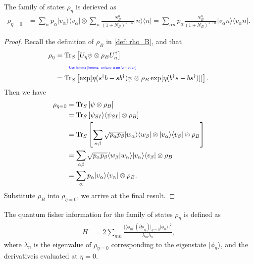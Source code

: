 \documentclass[../../note.tex]{subfiles}
\begin{document}
\begin{lemma}[$\rho_{\eta = 0}$]
    The family of states $\rho_{\eta}$ is derieved as
    \begin{align}
        \rho_{\eta = 0}
        &= \sum_{\alpha} p_{\alpha} \vert v_{\alpha} \rangle \langle v_{\alpha} \vert \otimes \sum_n \frac{N_B^n}{(1 + N_B)^{1 + n}} \vert n \rangle \langle n \vert = \sum_{\alpha n} p_{\alpha} \frac{N_B^n}{(1+N_B)^{1+n}} \vert v_{\alpha} n \rangle \langle v_{\alpha } n \vert.
    \end{align}
\end{lemma}
\begin{proof}
    Recall the definition of $\rho_B$ in \ref{def: rho_B}, and that 
    \begin{align}
        \rho_{\eta}
        &= \operatorname{Tr}_S\left[U_{\eta} \psi \otimes \rho_B U_{\eta}^\dagger \right] \\
        &\qquad\text{\color{blue}{\tiny\sffamily Use lemma \ref{lemma: unitary transformation}}} \nonumber \\
        &= \operatorname{Tr}_S\left[\exp[\eta (s^\dagger b -s b^{\dagger}) \psi \otimes \rho_B \exp[\eta(b^\dagger s - b s^\dagger)]] \right].
    \end{align}
    Then we have
    \begin{align}
        \rho_{\eta = 0}
        &= \operatorname{Tr}_S\left[\psi \otimes \rho_B \right]  \\
        &= \operatorname{Tr}_S\left[\psi_{SI} \rangle \langle \psi_{SI} \vert \otimes \rho_B \right] \\
        &= \operatorname{Tr}_S\left[\sum_{\alpha \beta} \sqrt{p_{\alpha} p_{\beta}} \vert w_{\alpha} \rangle \langle w_{\beta} \vert \otimes \vert v_{\alpha} \rangle \langle v_{\beta} \vert \otimes \rho_B \right] \\
        &= \sum_{\alpha \beta} \sqrt{p_{\alpha} p_{\beta}} \langle w_{\beta} \vert w_{\alpha} \rangle \vert v_{\alpha}\rangle \langle v_{\beta} \vert \otimes \rho_B \\
        &= \sum_{\alpha} p_{\alpha} \vert v_{\alpha} \rangle \langle v_{\alpha} \vert \otimes \rho_B.
    \end{align}
    Substitute $\rho_B$ into $\rho_{\eta=0}$, we arrive at the final result.
\end{proof}

\begin{definition}
    The quantum fisher information for the family of states $\rho_{\eta}$ is defined as
    \begin{align}
        H
        &= 2 \sum_{mn} \frac{\vert \langle \phi_m \vert (\partial \rho_{\eta})\vert_{\eta = 0} \vert \phi_n \rangle \vert^2}{\lambda_m \lambda_n},
    \end{align}
    where $\lambda_n$ is the eigenvalue of $\rho_{\eta = 0}$ corresponding to the eigenstate $\vert \phi_n \rangle$, and the derivativeis evaluated at $\eta = 0$.
\end{definition}
\end{document}
